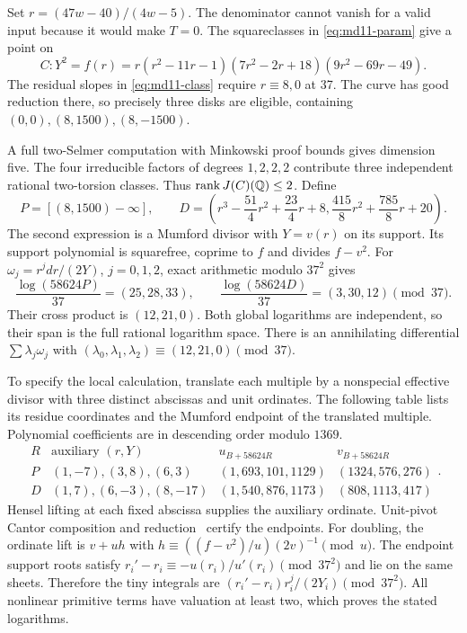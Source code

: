 Set $r=(47w-40)/(4w-5)$. The denominator cannot vanish for a valid
input because it would make $T=0$. The squareclasses in
\eqref{eq:md11-param} give a point on
\[
 C:Y^2=f(r)=r(r^2-11r-1)(7r^2-2r+18)(9r^2-69r-49).
\]
The residual slopes in \eqref{eq:md11-class} require $r\equiv8,0$
at 37. The curve has good reduction there, so precisely three disks
are eligible, containing $(0,0),(8,1500),(8,-1500)$.

A full two-Selmer computation with Minkowski proof bounds gives
dimension five. The four irreducible factors of degrees $1,2,2,2$
contribute three independent rational two-torsion classes. Thus
$\operatorname{rank}J(C)(\mathbb Q)\leq2$.
Define
\[
 P=[(8,1500)-\infty],\qquad
 D=\left(r^3-\frac{51}{4}r^2+\frac{23}{4}r+8,
              \frac{415}{8}r^2+\frac{785}{8}r+20\right).
\]
The second expression is a Mumford divisor with $Y=v(r)$ on its
support. Its support polynomial is squarefree, coprime to $f$ and
divides $f-v^2$. For $\omega_j=r^jdr/(2Y)$, $j=0,1,2$, exact
arithmetic modulo $37^2$ gives
\[
 \frac{\log(58624P)}{37}=(25,28,33),\qquad
 \frac{\log(58624D)}{37}=(3,30,12)\pmod{37}.
\]
Their cross product is $(12,21,0)$. Both global logarithms are
independent, so their span is the full rational logarithm space.
There is an annihilating differential $\sum\lambda_j\omega_j$ with
$(\lambda_0,\lambda_1,\lambda_2)\equiv(12,21,0)\pmod{37}$.

To specify the local calculation, translate each multiple by a
nonspecial effective divisor with three distinct abscissas and unit
ordinates. The following table lists its residue coordinates and the
Mumford endpoint of the translated multiple. Polynomial coefficients
are in descending order modulo $1369$.
\[
\begin{array}{c|c|c|c}
R&\text{auxiliary }(r,Y)&u_{B+58624R}&v_{B+58624R}\\ \hline
P&(1,-7),(3,8),(6,3)&(1,693,101,1129)&(1324,576,276)\\
D&(1,7),(6,-3),(8,-17)&(1,540,876,1173)&(808,1113,417)
\end{array}.
\]
Hensel lifting at each fixed abscissa supplies the auxiliary ordinate.
Unit-pivot Cantor composition and reduction~\cite{Cantor} certify the endpoints.
For doubling, the ordinate lift is $v+uh$ with
$h\equiv((f-v^2)/u)(2v)^{-1}\pmod u$. The endpoint support roots
satisfy $r_i'-r_i\equiv-u(r_i)/u'(r_i)\pmod{37^2}$ and lie on
the same sheets. Therefore the tiny integrals are
$(r_i'-r_i)r_i^j/(2Y_i)\pmod{37^2}$. All nonlinear primitive
terms have valuation at least two, which proves the stated logarithms.

